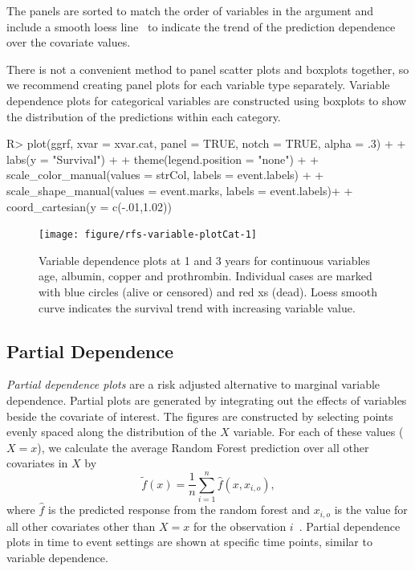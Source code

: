 \documentclass[nojss]{jss}\usepackage[]{graphicx}\usepackage[]{color}
\begin{document}
The panels are sorted to match the order of variables in the  argument and include a smooth loess line~\citep{cleveland:1981,cleveland:1988} to indicate the trend of the prediction dependence over the covariate values.

There is not a convenient method to panel scatter plots and boxplots together, so we recommend creating panel plots for each variable type separately. Variable dependence plots for categorical variables are constructed using boxplots to show the distribution of the predictions within each category. 

\begin{Schunk}
\begin{Sinput}
R> plot(ggrf, xvar = xvar.cat, panel = TRUE, notch = TRUE, alpha = .3) + 
+   labs(y = "Survival") + 
+   theme(legend.position = "none") + 
+   scale_color_manual(values = strCol, labels = event.labels) + 
+   scale_shape_manual(values = event.marks, labels = event.labels)+
+   coord_cartesian(y = c(-.01,1.02))
\end{Sinput}
\begin{figure}[!htpb]

{\centering \texttt{[image: figure/rfs-variable-plotCat-1]} 

}

\caption[Variable dependence plots at 1 and 3 years for continuous variables age, albumin, copper and prothrombin]{Variable dependence plots at 1 and 3 years for continuous variables age, albumin, copper and prothrombin. Individual cases are marked with blue circles (alive or censored) and red xs (dead). Loess smooth curve indicates the survival trend with increasing variable value.\label{fig:variable-plotCat}}
\end{figure}
\end{Schunk}

\subsection{Partial Dependence}\label{S:partialdependence}

\emph{Partial dependence plots} are a risk adjusted alternative to marginal variable dependence. Partial plots are generated by integrating out the effects of variables beside the covariate of interest. The figures are constructed by selecting points evenly spaced along the distribution of the $X$ variable. For each of these values ($X = x$), we calculate the average Random Forest prediction over all other covariates in $X$ by
\begin{equation}
\tilde{f}(x) = \frac{1}{n} \sum_{i = 1}^n \hat{f}(x, x_{i, o}), 
\label{E:partial}
\end{equation}
where $\hat{f}$ is the predicted response from the random forest and $x_{i, o}$ is the value for all other covariates other than $X = x$ for the observation $i$~\citep{Friedman:2000}. Partial dependence plots in time to event settings are shown at specific time points, similar to variable dependence.
\end{document}
